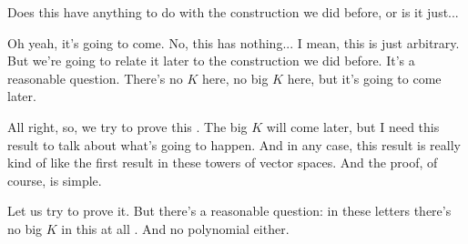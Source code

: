 \begin{student}
Does this have anything to do with the construction we did before, or is it just...
\end{student}

\begin{speech}[00:23:48 - 00:25:00]
Oh yeah, it's going to come. No, this has nothing... I mean, this is just arbitrary. But we're going to relate it later to the construction we did before. It's a reasonable question. There's no $K$ here, no big $K$ here, but it's going to come later.

All right, so, we try to prove this . The big $K$ will come later, but I need this result to talk about what's going to happen. And in any case, this result is really kind of like the first result in these towers of vector spaces. And the proof, of course, is simple.

Let us try to prove it. But there's a reasonable question: in these letters there's no big $K$ in this at all . And no polynomial either.
\end{speech}

